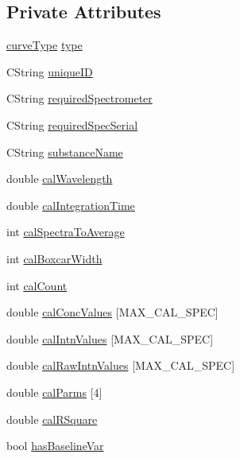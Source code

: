 \subsection*{Private Attributes}
\begin{DoxyCompactItemize}
\item 
\hyperlink{classCCalibrationCurve_ab9d3dc7e1f672a8bd6b7705f94798b7a}{curveType} \hyperlink{classCCalibrationCurve_a4bab63d0e43e43415ccd187ae08d511e}{type}
\item 
CString \hyperlink{classCCalibrationCurve_a7634cd9a6c79e0e68ecbe4fd5ed480cb}{uniqueID}
\item 
CString \hyperlink{classCCalibrationCurve_a2cd5d2fd5debcc2791cb8ff6fa7f15a4}{requiredSpectrometer}
\item 
CString \hyperlink{classCCalibrationCurve_a4cb54b94c003dbaede11c461ac8da44e}{requiredSpecSerial}
\item 
CString \hyperlink{classCCalibrationCurve_a4fb073155998e24486464ba870da81c3}{substanceName}
\item 
double \hyperlink{classCCalibrationCurve_a05ef3e4d96dbc566554e4d94434e56cc}{calWavelength}
\item 
double \hyperlink{classCCalibrationCurve_a3625101f7dc3ae37e347b36bb51b2605}{calIntegrationTime}
\item 
int \hyperlink{classCCalibrationCurve_a3dca7a8cb366dea3eb9d5ad12ee9affc}{calSpectraToAverage}
\item 
int \hyperlink{classCCalibrationCurve_ab1ef11c45a983e95342e31f51191a512}{calBoxcarWidth}
\item 
int \hyperlink{classCCalibrationCurve_a30ff71dcb7acaca69bc0a169e77681f1}{calCount}
\item 
double \hyperlink{classCCalibrationCurve_a1034401a36caabbad0f2ab2ffef2aff5}{calConcValues} \mbox{[}MAX\_\-CAL\_\-SPEC\mbox{]}
\item 
double \hyperlink{classCCalibrationCurve_a1ca7dd8bfec2fee56e6f35a5fcc344bf}{calIntnValues} \mbox{[}MAX\_\-CAL\_\-SPEC\mbox{]}
\item 
double \hyperlink{classCCalibrationCurve_a98547faad841f428235be92291e7b10e}{calRawIntnValues} \mbox{[}MAX\_\-CAL\_\-SPEC\mbox{]}
\item 
double \hyperlink{classCCalibrationCurve_a2b0f4f43bd32a1b4484ddcd29e3632e5}{calParms} \mbox{[}4\mbox{]}
\item 
double \hyperlink{classCCalibrationCurve_aea9bdb495ccb4d3f3415bb7e0a9f68e0}{calRSquare}
\item 
bool \hyperlink{classCCalibrationCurve_a5c925ccae443af016a13ebb50436550f}{hasBaselineVar}

\end{DoxyCompactItemize}
